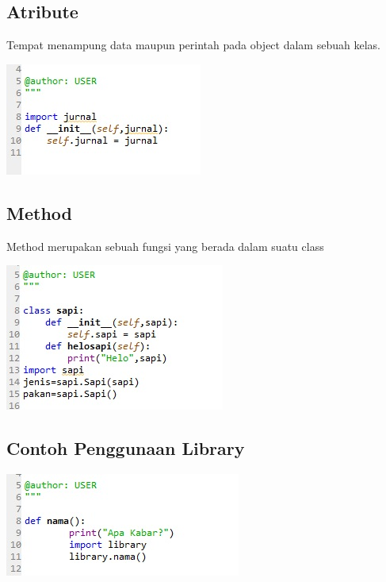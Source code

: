 \documentclass[a4paper,12pt]{report}
\begin{document}
\subsection{Atribute}
\par Tempat menampung data maupun perintah pada object dalam sebuah kelas.
    \begin{center}
    \includegraphics[width=11cm\textwidth]{Figure/atribut.jpg}
    \end{center}

\subsection{Method}
\par Method merupakan sebuah fungsi yang berada dalam suatu class
    \begin{center}
    \includegraphics[width=11cm\textwidth]{Figure/methode.jpg}
    \end{center}
    
\subsection{Contoh Penggunaan Library}
    \begin{center}
    \includegraphics[width=11cm\textwidth]{Figure/library.jpg}
    \end{center}
    
\end{document}
